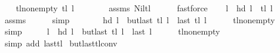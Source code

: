 \begin{isabellebody}
%
\isatagproof
{}\isamarkupfalse%
\isanewline
\ \ \isamarkupfalse%
\ tl{\isacharunderscore}{\kern0pt}non{\isacharunderscore}{\kern0pt}empty{\isacharcolon}{\kern0pt}\ {\isachardoublequoteopen}tl\ l\ {\isasymnoteq}\ {\isacharbrackleft}{\kern0pt}{\isacharbrackright}{\kern0pt}{\isachardoublequoteclose}\isanewline
\ \ \ \ \isamarkupfalse%
\ assms\ Nil{\isacharunderscore}{\kern0pt}tl\isanewline
\ \ \ \ \isamarkupfalse%
\ fastforce\isanewline
\ \ \isamarkupfalse%
\ {\isachardoublequoteopen}l\ {\isacharequal}{\kern0pt}\ hd\ l\ {\isacharhash}{\kern0pt}\ tl\ l{\isachardoublequoteclose}\isanewline
\ \ \ \ \isamarkupfalse%
\ assms{\isacharparenleft}{\kern0pt}{}{\isacharparenright}{\kern0pt}\isanewline
\ \ \ \ \isamarkupfalse%
\ simp\isanewline
\ \ \isamarkupfalse%
\ \isamarkupfalse%
\ {\isachardoublequoteopen}{\isachardot}{\kern0pt}{\isachardot}{\kern0pt}{\isachardot}{\kern0pt}\ {\isacharequal}{\kern0pt}\ hd\ l\ {\isacharhash}{\kern0pt}\ {\isacharparenleft}{\kern0pt}butlast\ {\isacharparenleft}{\kern0pt}tl\ l{\isacharparenright}{\kern0pt}\ {\isacharat}{\kern0pt}\ {\isacharbrackleft}{\kern0pt}last\ {\isacharparenleft}{\kern0pt}tl\ l{\isacharparenright}{\kern0pt}{\isacharbrackright}{\kern0pt}{\isacharparenright}{\kern0pt}{\isachardoublequoteclose}\isanewline
\ \ \ \ \isamarkupfalse%
\ tl{\isacharunderscore}{\kern0pt}non{\isacharunderscore}{\kern0pt}empty\isanewline
\ \ \ \ \isamarkupfalse%
\ simp\isanewline
\ \ \isamarkupfalse%
\ \isamarkupfalse%
\ {\isachardoublequoteopen}l\ {\isacharequal}{\kern0pt}\ hd\ l\ {\isacharhash}{\kern0pt}\ {\isacharparenleft}{\kern0pt}butlast\ {\isacharparenleft}{\kern0pt}tl\ l{\isacharparenright}{\kern0pt}\ {\isacharat}{\kern0pt}\ {\isacharbrackleft}{\kern0pt}last\ l{\isacharbrackright}{\kern0pt}{\isacharparenright}{\kern0pt}{\isachardoublequoteclose}\isanewline
\ \ \ \ \isamarkupfalse%
\ tl{\isacharunderscore}{\kern0pt}non{\isacharunderscore}{\kern0pt}empty\isanewline
\ \ \ \ \isamarkupfalse%
\ {\isacharparenleft}{\kern0pt}simp\ add{\isacharcolon}{\kern0pt}\ last{\isacharunderscore}{\kern0pt}tl{\isacharparenright}{\kern0pt}\isanewline
{}\isamarkupfalse%
%
\endisatagproof
{\isafoldproof}%
%
\isadelimproof
\isanewline
%
\endisadelimproof
\isanewline
{}\isamarkupfalse%
\ butlast{\isacharunderscore}{\kern0pt}tl{\isacharunderscore}{\kern0pt}conv{\isacharcolon}{\kern0pt}\isanewline

\end{isabellebody}
